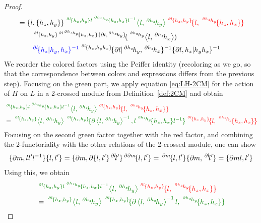 \documentclass[11pt, reqno]{amsart} %
\newcommand{\act}[1]{\,\sp{#1}\!}
\newcommand{\red}[1]{\textcolor{red}{#1}}
\newcommand{\blue}[1]{\textcolor{blue}{#1}}
\newcommand{\green}[1]{\textcolor{green!50!black}{#1}}
\theoremstyle{definition}
\theoremstyle{remark}
\numberwithin{equation}{section}
\begin{document}
\begin{proof}
\begin{align*}
  &= 
  \{l,\{h_z,h_y\}\}\green{\act{\act{\partial l}\{h_z,h_y\}l\act{\act{\partial h_z}h_y}\{h_z,h_x\}l^{-1}}\left<l,\act{\partial h_z}h_y\right>}\red{\act{\act{\partial l}\{h_z,h_y\}}\{l,\act{\act{\partial h_z}h_y}\{h_z,h_x\}\}} \\
  &\qquad \act{\act{\partial l}\{h_z,h_y\}\act{\partial l\act{\partial h_z}h_y}\{h_z,h_x\}\{\partial l,\act{\partial h_z}h_y\}}(\act{\act{\partial h_z}h_y}\left<l,\act{\partial h_z}h_x\right>) \\
  &\qquad \blue{\act{\partial l}\{h_z|h_y,h_x\}^{-1}}\act{\act{\partial l}\{h_z,h_yh_x\}}\{\partial l|\act{\partial h_z}h_y,\act{\partial h_z}h_x\}^{-1}\{\partial l,h_z|h_yh_x\}^{-1}
\end{align*}
We reorder the colored factors using the Peiffer identity (recoloring as we go, so that the correspondence between colors and expressions differs from the previous step). Focusing on the green part, we apply equation \eqref{eq:LH-2CM} for the action of $H$ on $L$ in a 2-crossed module from Definition~\ref{def:2CM} and obtain
\begin{align*}
  &\green{\act{\act{\partial l}\{h_z,h_y\}l\act{\act{\partial h_z}h_y}\{h_z,h_x\}l^{-1}}\left<l,\act{\partial h_z}h_y\right>}\red{\act{\act{\partial l}\{h_z,h_y\}}\{l,\act{\act{\partial h_z}h_y}\{h_z,h_x\}\}} \\
  &= \green{\act{\act{\partial l}\{h_z,h_y\}}\left<l,\act{\partial h_z}h_y\right>\act{\act{\partial l}\{h_z,h_y\}}\{\partial \left<l,\act{\partial h_z}h_y\right>^{-1},l\act{\act{\partial h_z}h_y}\{h_z,h_x\}l^{-1}\}}\red{\act{\act{\partial l}\{h_z,h_y\}}\{l,\act{\act{\partial h_z}h_y}\{h_z,h_x\}\}}
\end{align*}
Focusing on the second green factor together with the red factor, and combining the 2-functoriality with the other relations of the 2-crossed module, one can show
\[
  \{\partial m,ll'l^{-1}\}\{l,l'\} = \{\partial m,\partial\{l,l'\}\act{\partial l}l'\}\act{\partial\partial m}\{l,l'\} = \act{\partial m}\{l,l'\}\{\partial m,\act{\partial l}l'\} = \{\partial ml,l'\}
\]
Using this, we obtain
\begin{align*}
  &\green{\act{\act{\partial l}\{h_z,h_y\}l\act{\act{\partial h_z}h_y}\{h_z,h_x\}l^{-1}}\left<l,\act{\partial h_z}h_y\right>}\red{\act{\act{\partial l}\{h_z,h_y\}}\{l,\act{\act{\partial h_z}h_y}\{h_z,h_x\}\}} \\
  &= \green{\act{\act{\partial l}\{h_z,h_y\}}\left<l,\act{\partial h_z}h_y\right>\act{\act{\partial l}\{h_z,h_y\}}\{\partial \left<l,\act{\partial h_z}h_y\right>^{-1}l,\act{\act{\partial h_z}h_y}\{h_z,h_x\}\}} \\

\end{align*}
\end{proof}
\end{document}
